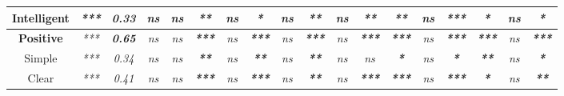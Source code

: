 \begin{sidewaystable}
\begin{tabular}{c|cc|ccccccccccccccc|}
    \multicolumn{1}{|c|}{Intelligent}            & \multicolumn{1}{c|}{\textit{***}} & \textit{0.33}          & \multicolumn{1}{c|}{\textit{ns}} & \multicolumn{1}{c|}{\textit{ns}} & \multicolumn{1}{c|}{\textit{\textbf{**}}}  & \multicolumn{1}{c|}{\textit{ns}}          & \multicolumn{1}{c|}{\textit{\textbf{*}}}   & \multicolumn{1}{c|}{\textit{ns}} & \multicolumn{1}{c|}{\textit{\textbf{**}}}  & \multicolumn{1}{c|}{\textit{ns}} & \multicolumn{1}{c|}{\textit{\textbf{**}}}  & \multicolumn{1}{c|}{\textit{\textbf{**}}}  & \multicolumn{1}{c|}{\textit{ns}}         & \multicolumn{1}{c|}{\textit{\textbf{***}}} & \multicolumn{1}{c|}{\textit{\textbf{*}}}   & \multicolumn{1}{c|}{\textit{ns}} & \textit{\textbf{*}}   \\ \hline
    \multicolumn{1}{|c|}{\textbf{Positive}}      & \multicolumn{1}{c|}{\textit{***}} & \textit{\textbf{0.65}} & \multicolumn{1}{c|}{\textit{ns}} & \multicolumn{1}{c|}{\textit{ns}} & \multicolumn{1}{c|}{\textit{\textbf{***}}} & \multicolumn{1}{c|}{\textit{ns}}          & \multicolumn{1}{c|}{\textit{\textbf{***}}} & \multicolumn{1}{c|}{\textit{ns}} & \multicolumn{1}{c|}{\textit{\textbf{***}}} & \multicolumn{1}{c|}{\textit{ns}} & \multicolumn{1}{c|}{\textit{\textbf{***}}} & \multicolumn{1}{c|}{\textit{\textbf{***}}} & \multicolumn{1}{c|}{\textit{ns}}         & \multicolumn{1}{c|}{\textit{\textbf{***}}} & \multicolumn{1}{c|}{\textit{\textbf{***}}} & \multicolumn{1}{c|}{\textit{ns}} & \textit{\textbf{***}} \\ \hline
    \multicolumn{1}{|c|}{Simple}                 & \multicolumn{1}{c|}{\textit{***}} & \textit{0.34}          & \multicolumn{1}{c|}{\textit{ns}} & \multicolumn{1}{c|}{\textit{ns}} & \multicolumn{1}{c|}{\textit{\textbf{**}}}  & \multicolumn{1}{c|}{\textit{ns}}          & \multicolumn{1}{c|}{\textit{\textbf{**}}}  & \multicolumn{1}{c|}{\textit{ns}} & \multicolumn{1}{c|}{\textit{\textbf{**}}}  & \multicolumn{1}{c|}{\textit{ns}} & \multicolumn{1}{c|}{\textit{ns}}           & \multicolumn{1}{c|}{\textit{\textbf{*}}}   & \multicolumn{1}{c|}{\textit{ns}}         & \multicolumn{1}{c|}{\textit{\textbf{*}}}   & \multicolumn{1}{c|}{\textit{\textbf{**}}}  & \multicolumn{1}{c|}{\textit{ns}} & \textit{\textbf{*}}   \\ \hline
    \multicolumn{1}{|c|}{Clear}                  & \multicolumn{1}{c|}{\textit{***}} & \textit{0.41}          & \multicolumn{1}{c|}{\textit{ns}} & \multicolumn{1}{c|}{\textit{ns}} & \multicolumn{1}{c|}{\textit{\textbf{***}}} & \multicolumn{1}{c|}{\textit{ns}}          & \multicolumn{1}{c|}{\textit{\textbf{***}}} & \multicolumn{1}{c|}{\textit{ns}} & \multicolumn{1}{c|}{\textit{\textbf{**}}}  & \multicolumn{1}{c|}{\textit{ns}} & \multicolumn{1}{c|}{\textit{\textbf{***}}} & \multicolumn{1}{c|}{\textit{\textbf{***}}} & \multicolumn{1}{c|}{\textit{ns}}         & \multicolumn{1}{c|}{\textit{\textbf{***}}} & \multicolumn{1}{c|}{\textit{\textbf{*}}}   & \multicolumn{1}{c|}{\textit{ns}} & \textit{\textbf{**}}  \\ \hline

\end{tabular}
\end{sidewaystable}
